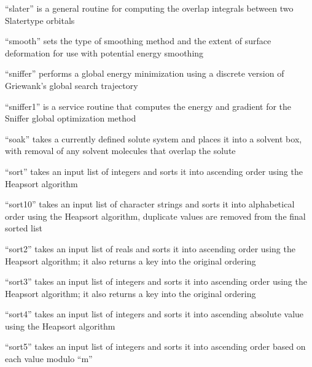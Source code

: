 \documentclass[letterpaper,11pt,english]{sphinxmanual}
\begin{document}

“slater” is a general routine for computing the overlap integrals between two Slater\sphinxhyphen{}type orbitals


“smooth” sets the type of smoothing method and the extent of surface deformation for use with potential energy smoothing


“sniffer” performs a global energy minimization using a discrete version of Griewank’s global search trajectory


“sniffer1” is a service routine that computes the energy and gradient for the Sniffer global optimization method


“soak” takes a currently defined solute system and places it into a solvent box, with removal of any solvent molecules that overlap the solute


“sort” takes an input list of integers and sorts it into ascending order using the Heapsort algorithm


“sort10” takes an input list of character strings and sorts it into alphabetical order using the Heapsort algorithm, duplicate values are removed from the final sorted list


“sort2” takes an input list of reals and sorts it into ascending order using the Heapsort algorithm; it also returns a key into the original ordering


“sort3” takes an input list of integers and sorts it into ascending order using the Heapsort algorithm; it also returns a key into the original ordering


“sort4” takes an input list of integers and sorts it into ascending absolute value using the Heapsort algorithm


“sort5” takes an input list of integers and sorts it into ascending order based on each value modulo “m”
\end{document}
